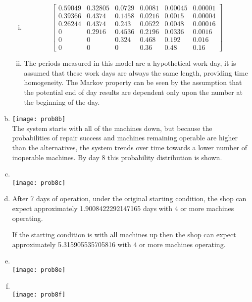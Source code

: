 \documentclass[answers]{exam}
\begin{document}
\begin{questions}
\begin{solution}
\begin{enumerate}[(a)]
\begin{enumerate}[i.]
			\item 
			\[\begin{bmatrix}
				0.59049 & 0.32805 & 0.0729 & 0.0081 & 0.00045 & 0.00001 \\
				0.39366 & 0.4374  & 0.1458 & 0.0216 & 0.0015  & 0.00004 \\
				0.26244 & 0.4374  & 0.243  & 0.0522 & 0.0048  & 0.00016 \\
				0       & 0.2916  & 0.4536 & 0.2196 & 0.0336  & 0.0016  \\
				0       & 0       & 0.324  & 0.468  & 0.192   & 0.016   \\
				0       & 0       & 0      & 0.36   & 0.48    & 0.16    
			\end{bmatrix}\]
		
			\item 
			The periods measured in this model are a hypothetical work day, 
			it is assumed that these work days are always the same length,
			providing time homogeneity.
			The Markov property can be seen by the assumption that the potential end of day results
			are dependent only upon the number at the beginning of the day.
		\end{enumerate}
	
		\item 
		\texttt{[image: prob8b]} \\	
		The system starts with all of the machines down,
		but because the probabilities of repair success and machines remaining operable are higher than the alternatives,
		the system trends over time towards a lower number of inoperable machines.
		By day 8 this probability distribution is shown.
		
		\item 
		\phantom{c}\\
		\texttt{[image: prob8c]}
		
		\item 
		After 7 days of operation, under the original starting condition, the shop can expect 
		approximately 1.9008422292147165 days with 4 or more machines operating.
		
		If the starting condition is with all machines up then the shop can expect
		approximately 5.315905535705816  with 4 or more machines operating.
		
		\item
		\phantom{e}\\ 
		\texttt{[image: prob8e]}

		\item 
		\phantom{f}\\
		\texttt{[image: prob8f]}

	\end{enumerate}
\end{solution}



\end{questions}
\end{document}
